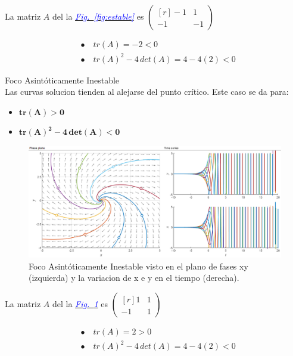 \documentclass[12pt,a4paper]{report} %
\newcommand{\fref}[1]{\hyperref[#1]{\textcolor{blue}{\textit{Fig.~\ref*{#1}}}}}
\begin{document}
	La matriz $A$ del la \fref{fig:estable} es 
	$\begin{pmatrix*}[r]
		-1 & 1 \\
		-1 & -1
	\end{pmatrix*}$
	
	\begin{align*}
		&\bullet\quad tr(A)=-2<0 \\[2mm]
		&\bullet\quad tr(A)^2-4\,det(A)=4-4(2)<0
	\end{align*}
	
	\newpage
	
	{\Large\textbullet\quad Foco Asintóticamente Inestable}\\[0.5cm]
	
	Las curvas solucion tienden al alejarse del punto crítico. Este caso se da para: 
	\begin{itemize}
		\item $\bm{tr(A)>0}$
		\item $\bm{tr(A)^2-4\,det(A)<0}$
	\end{itemize}
	
	\begin{figure}[h]
		\centering
		\includegraphics[width=1\textwidth]{inestable.png}
		\caption{Foco Asintóticamente Inestable visto en el plano de fases xy (izquierda) y la variacion de x e y en el tiempo (derecha).}
		\label{fig:inestable}
	\end{figure}\smallskip
	
	La matriz $A$ del la \fref{fig:inestable} es 
	 $\begin{pmatrix*}[r]
		 1 & 1 \\
		-1 & 1
	 \end{pmatrix*}$
	
	\begin{align*}
		&\bullet\quad tr(A)=2>0 \\[2mm]
		&\bullet\quad tr(A)^2-4\,det(A)=4-4(2)<0
	\end{align*}
	
\end{document}
